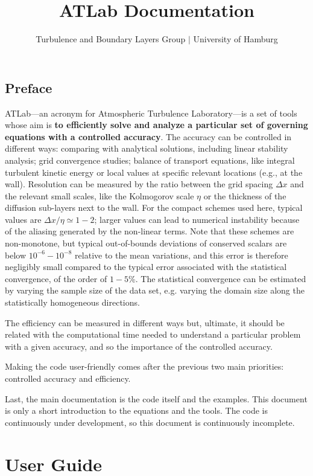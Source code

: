 \documentclass[a4paper,11pt]{book}
\title{{\bf AT}\textcolor{black!50}{Lab} Documentation}
\author{Turbulence and Boundary Layers Group $|$ University of Hamburg}
\begin{document}
\frontmatter
\pagestyle{empty}
\maketitle
\tableofcontents

\setlength{\parskip}{0.5\baselineskip}
%

\chapter*{Preface}
\sloppy

ATLab---an acronym for Atmospheric Turbulence Laboratory---is a set of tools whose aim is {\bf to efficiently solve and analyze a particular set of governing equations with a controlled accuracy}. The accuracy can be controlled in different ways: comparing with analytical solutions, including linear stability analysis; grid convergence studies; balance of transport equations, like integral turbulent kinetic energy or local values at specific relevant locations (e.g., at the wall). Resolution can be measured by the ratio between the grid spacing $\Delta x$ and the relevant small scales, like the Kolmogorov scale $\eta$ or the thickness of the diffusion sub-layers next to the wall. For the compact schemes used here, typical values are $\Delta x/\eta\simeq 1-2$; larger values can lead to numerical instability because of the aliasing generated by the non-linear terms. Note that these schemes are non-monotone, but typical out-of-bounds deviations of conserved scalars are below $10^{-6}-10^{-8}$ relative to the mean variations, and this error is therefore negligibly small compared to the typical error associated with the statistical convergence, of the order of $1-5$\%. The statistical convergence can be estimated by varying the sample size of the data set, e.g. varying the domain size along the statistically homogeneous directions. 

The efficiency can be measured in different ways but, ultimate, it should be related with the computational time needed to understand a particular problem with a given accuracy, and so the importance of the controlled accuracy. 

Making the code user-friendly comes after the previous two main priorities: controlled accuracy and efficiency.

Last, the main documentation is the code itself and the examples. This document is only a short introduction to the equations and the tools. The code is continuously under development, so this document is continuously incomplete.

\mainmatter
\pagestyle{fancy}

\part{User Guide}

% 
% 
% 
% 


\backmatter


\end{document}
